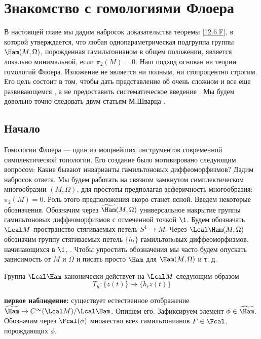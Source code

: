 \chapter[Гомологии Флоера]{Знакомство с гомологиями Флоера}\label{sec:13}

В настоящей главе мы дадим набросок доказательства теоремы
\ref{12.6.F}, в которой утверждается, что любая однопараметрическая
подгруппа группы $\Ham(M, \Omega)$, порожденная гамильтонианом в общем
положении, является локально минимальной, если $π_{2}(M) = 0$.
Наш подход основан на теории гомологий Флоера. Изложение не является
ни полным, ни стопроцентно строгим.
Его цель состоит в том, чтобы дать представление об очень сложном и
все еще развивающемся , а не
предоставить систематическое введение .
Мы будем довольно точно следовать двум статьям М.Шварца \cite{Sch2,
  Sch3}.

\section{Начало}\label{sec:13.1}
Гомологии Флоера --- один из мощнейших инструментов современной
симплектической топологии. 
Его создание было мотивировано следующим вопросом: Какие бывают инварианты
гамильтоновых диффеоморфизмов?
Дадим набросок ответа.
Мы будем работать на связном замкнутом симплектическом многообразии
$(M,\Omega)$, для простоты предполагая асферичность многообразия:
$π_{2}(M) = 0$.
Роль этого предположения скоро станет ясной.
Введем некоторые обозначения.
Обозначим через $\widetilde\Ham(M,\Omega)$ универсальное накрытие
группы гамильтоновых диффеоморфизмов с отмеченной точкой $\1$.
Будем обозначать $\Lcal M$ пространство стягиваемых петель $S^{1}\to
M$.
Через $\Lcal\Ham(M,\Omega)$ обозначим группу стягиваемых петель
$\{h_{t}\}$ гамильтонoвых диффеоморфизмов, начинающихся в $\1$,
.
Чтобы упростить обозначения мы часто будем опускать зависимость от $M$
и $\Omega$ и писать просто $\Ham$ для $\Ham(M, \Omega)$ и т. д. 

Группа $\Lcal\Ham$ канонически действует на $\Lcal M$
следующим образом
\[
T_{h}: \{z(t)\}\mapsto \{h_{t}z(t)\}
\]

  
\noindent\textbf{первое наблюдение:} существует естественное
отображение $\widetilde\Ham\to C^{\infty}(\Lcal M)/\Lcal\Ham$.
Опишем его. Зафиксируем элемент $\phi\in\widetilde\Ham$. Обозначим
через $\Fcal(\phi)$ множество всех гамильтонианов $F\in\Fcal$,
порождающих $\phi$.

